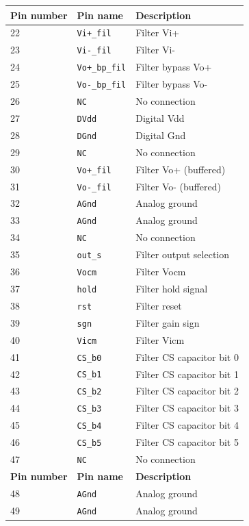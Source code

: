 \begin{center}
\begin{longtable}{|l|l|l|}
{\bf Pin number} & {\bf Pin name} & {\bf Description} \\ \hline\hline
22 & \verb=Vi+_fil= & Filter Vi+ \\\hline
23 & \verb=Vi-_fil= & Filter Vi- \\\hline
24 & \verb=Vo+_bp_fil= & Filter bypass Vo+  \\\hline
25 & \verb=Vo-_bp_fil= & Filter bypass Vo- \\\hline
26 & \verb=NC= & No connection \\\hline
27 & \verb=DVdd= & Digital Vdd \\\hline
28 & \verb=DGnd= & Digital Gnd \\\hline
29 & \verb=NC= & No connection \\\hline
30 & \verb=Vo+_fil= & Filter Vo+ (buffered) \\\hline
31 & \verb=Vo-_fil= & Filter Vo- (buffered) \\\hline
32 & \verb=AGnd= & Analog ground \\\hline
33 & \verb=AGnd= & Analog ground \\\hline
34 & \verb=NC= & No connection \\\hline
35 & \verb=out_s= & Filter output selection \\\hline
36 & \verb=Vocm= & Filter Vocm \\\hline
37 & \verb=hold= & Filter hold signal  \\\hline
38 & \verb=rst= & Filter reset \\\hline
39 & \verb=sgn= & Filter gain sign \\\hline
40 & \verb=Vicm= & Filter Vicm \\\hline
41 & \verb=CS_b0= & Filter CS capacitor bit 0 \\\hline
42 & \verb=CS_b1= & Filter CS capacitor bit 1 \\\hline
43 & \verb=CS_b2= & Filter CS capacitor bit 2 \\\hline
44 & \verb=CS_b3= & Filter CS capacitor bit 3 \\\hline
45 & \verb=CS_b4= & Filter CS capacitor bit 4 \\\hline
46 & \verb=CS_b5= & Filter CS capacitor bit 5 \\\hline
47 & \verb=NC= & No connection \\\hline
{\bf Pin number} & {\bf Pin name} & {\bf Description} \\ \hline\hline
48 & \verb=AGnd= & Analog ground \\\hline
49 & \verb=AGnd= & Analog ground \\\hline

\end{longtable}
\end{center}
